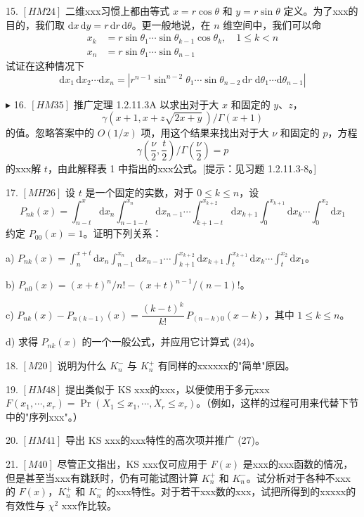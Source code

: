 15. $[HM24]$ 二维xxx习惯上都由等式 $x = r\cos\theta$ 和 $y = r\sin\theta$ 定义。为了xxx的目的，我们取 $\mathrm{d}x\,\mathrm{d}y = r\,\mathrm{d}r\,\mathrm{d}\theta$。更一般地说，在 $n$ 维空间中，我们可以命
\[
\begin{aligned}
x_k &= r\sin\theta_1 \cdots \sin\theta_{k-1}\cos\theta_k, \quad 1 \leqslant k < n \\
x_n &= r\sin\theta_1 \cdots \sin\theta_{n-1}
\end{aligned}
\]
试证在这种情况下
\[
\mathrm{d}x_1\,\mathrm{d}x_2 \cdots \mathrm{d}x_n = \left| r^{n-1} \sin^{n-2}\theta_1 \cdots \sin\theta_{n-2}\,\mathrm{d}r\;\mathrm{d}\theta_1 \cdots \mathrm{d}\theta_{n-1} \right|
\]

$\blacktriangleright$ 16. $[HM35]$ 推广定理 1.2.11.3A 以求出对于大 $x$ 和固定的 $y$、$z$，
\[
\gamma(x+1, x+z\sqrt{2x+y}\,)/\Gamma(x+1)
\]
的值。忽略答案中的 $O(1/x)$ 项，用这个结果来找出对于大 $\nu$ 和固定的 $p$，方程
\[
\gamma\!\left(\frac{\nu}{2}, \frac{t}{2}\right) \bigg/ \Gamma\!\left(\frac{\nu}{2}\right) = p
\]
的xxx解 $t$，由此解释表 1 中指出的xxx公式。[提示：见习题 1.2.11.3-8。]

17. $[MH26]$ 设 $t$ 是一个固定的实数，对于 $0 \leqslant k \leqslant n$，设
\[
P_{nk}(x) = \int_{n-t}^{x} \mathrm{d}x_n \int_{n-1-t}^{x_n} \mathrm{d}x_{n-1} \cdots \int_{k+1-t}^{x_{k+2}} \mathrm{d}x_{k+1} \int_0^{x_{k+1}} \mathrm{d}x_k \cdots \int_0^{x_2} \mathrm{d}x_1
\]
约定 $P_{00}(x) = 1$。证明下列关系：

a) $P_{nk}(x) = \displaystyle\int_n^{x+t} \mathrm{d}x_n \int_{n-1}^{x_n} \mathrm{d}x_{n-1} \cdots \int_{k+1}^{x_{k+2}} \mathrm{d}x_{k+1} \int_t^{x_{k+1}} \mathrm{d}x_k \cdots \int_t^{x_2} \mathrm{d}x_1$。

b) $P_{n0}(x) = (x+t)^n / n! - (x+t)^{n-1} / (n-1)!$。

c) $P_{nk}(x) - P_{n(k-1)}(x) = \dfrac{(k-t)^k}{k!}\,P_{(n-k)0}(x-k)$，其中 $1 \leqslant k \leqslant n$。

d) 求得 $P_{nk}(x)$ 的一个一般公式，并应用它计算式 (24)。

18. $[M20]$ 说明为什么 $K_n^-$ 与 $K_n^+$ 有同样的xxxxxx的"简单"原因。

19. $[HM48]$ 提出类似于 KS xxx的xxx，以便使用于多元xxx $F(x_1, \cdots, x_r) = \Pr(X_1 \leqslant x_1, \cdots, X_r \leqslant x_r)$。（例如，这样的过程可用来代替下节中的"序列xxx"。）

20. $[HM41]$ 导出 KS xxx的xxx特性的高次项并推广 (27)。

21. $[M40]$ 尽管正文指出，KS xxx仅可应用于 $F(x)$ 是xxx的xxx函数的情况，但是甚至当xxx有跳跃时，仍有可能试图计算 $K_n^+$ 和 $K_n^-$。试分析对于各种不xxx的 $F(x)$，$K_n^+$ 和 $K_n^-$ 的xxx特性。对于若干xxx数的xxx，试把所得到的xxxxx的有效性与 $\chi^2$ xxx作比较。

